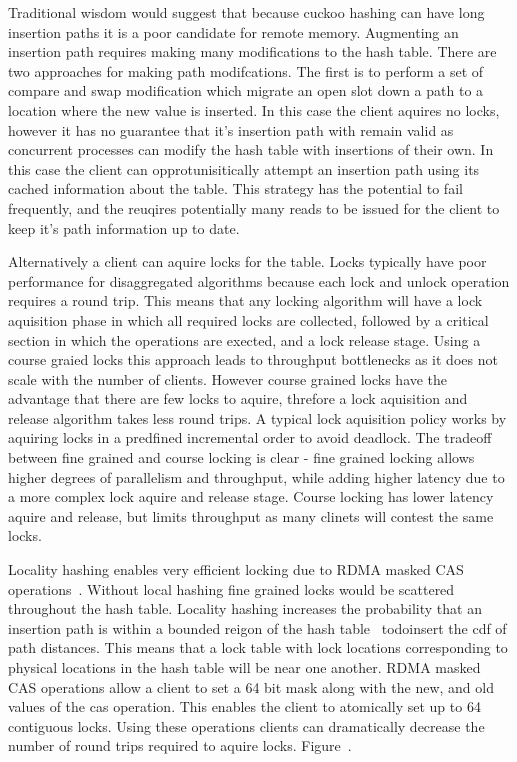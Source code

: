Traditional wisdom would suggest that because cuckoo hashing
can have long insertion paths it is a poor candidate for
remote memory. Augmenting an insertion path requires making
many modifications to the hash table.  There are two
approaches for making path modifcations. The first is to
perform a set of compare and swap modification which migrate
an open slot down a path to a location where the new value
is inserted. In this case the client aquires no locks,
however it has no guarantee that it's insertion path with
remain valid as concurrent processes can modify the hash
table with insertions of their own. In this case the client
can opprotunisitically attempt an insertion path using its
cached information about the table. This strategy has the
potential to fail frequently, and the reuqires potentially
many reads to be issued for the client to keep it's path
information up to date. ~

Alternatively a client can aquire locks for the table. Locks
typically have poor performance for disaggregated algorithms
because each lock and unlock operation requires a round
trip. This means that any locking algorithm will have a lock
aquisition phase in which all required locks are collected,
followed by a critical section in which the operations are
exected, and a lock release stage. Using a course graied
locks this approach leads to throughput bottlenecks as it
does not scale with the number of clients. However course
grained locks have the advantage that there are few locks to
aquire, threfore a lock aquisition and release algorithm
takes less round trips. A typical lock aquisition policy
works by aquiring locks in a predfined incremental order to
avoid deadlock. The tradeoff between fine grained and course
locking is clear - fine grained locking allows higher
degrees of parallelism and throughput, while adding higher
latency due to a more complex lock aquire and release stage.
Course locking has lower latency aquire and release, but
limits throughput as many clinets will contest the same
locks.

Locality hashing enables very efficient locking due to RDMA
masked CAS operations~. Without
local hashing fine grained locks would be scattered
throughout the hash table. Locality hashing increases the
probability that an insertion path is within a bounded
reigon of the hash table ~todo{insert the cdf of path
distances}. This means that a lock table with lock locations
corresponding to physical locations in the hash table will
be near one another.  RDMA masked CAS operations allow a
client to set a 64 bit mask along with the new, and old
values of the cas operation. This enables the client to
atomically set up to 64 contiguous locks. Using these
operations clients can dramatically decrease the number of
round trips required to aquire locks. Figure~.

